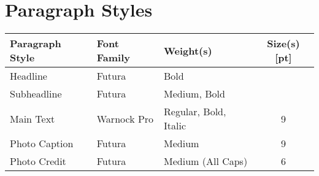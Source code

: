 \chapter{Paragraph Styles}

\begin{tabular}{p{3cm} p{3cm} p{6cm} c } 

Paragraph Style & Font Family & Weight(s) & Size(s) [pt] \\ \hline
Headline  & Futura & Bold & \\
Subheadline & Futura & Medium, Bold & \\
Main Text & Warnock Pro & Regular, Bold, Italic & 9 \\
Photo Caption & Futura & Medium & 9 \\
Photo Credit & Futura & Medium (All Caps) & 6 \\


\end{tabular}

